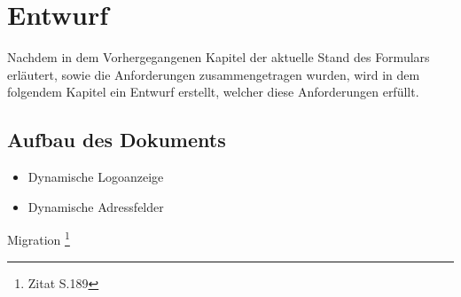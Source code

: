 \chapter{Entwurf}

Nachdem in dem Vorhergegangenen Kapitel der aktuelle Stand des Formulars erläutert, sowie die Anforderungen zusammengetragen wurden, wird in dem folgendem Kapitel ein Entwurf erstellt, welcher diese Anforderungen erfüllt. 
\section{Aufbau des Dokuments}
\begin{itemize}
	\item Dynamische Logoanzeige
	\item Dynamische Adressfelder
	
\end{itemize}

Migration \footnote{Zitat \cite{Schmiechen.2016} S.189}